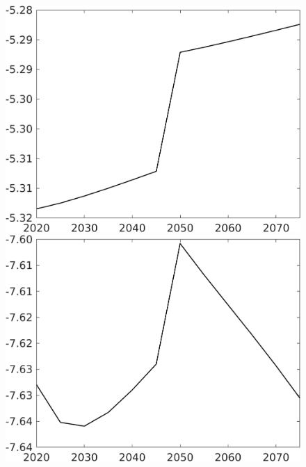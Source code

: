 \documentclass[12pt]{article}
\begin{document}
\begin{figure}[h!!]
\begin{minipage}[]{0.32\textwidth}
\end{minipage}	
\begin{minipage}[]{0.32\textwidth}
\includegraphics[width=1\textwidth]{../../codding_model/own_basedOnFried/optimalPol_010922_revision/figures/all_13Sept22/CompTaufPER_bytaul_Reg0_hl_spillover0_nsk0_xgr0_knspil0_sep1_LFlimit1_emsbase0_countec0_GovRev0_etaa0.79_lgd0.png}
\end{minipage}	
\begin{minipage}[]{0.32\textwidth}
\includegraphics[width=1\textwidth]{../../codding_model/own_basedOnFried/optimalPol_010922_revision/figures/all_13Sept22/CompTaufPER_bytaul_Reg0_C_spillover0_nsk0_xgr0_knspil0_sep1_LFlimit1_emsbase0_countec0_GovRev0_etaa0.79_lgd0.png}

\end{minipage}
\end{figure}
\end{document}
